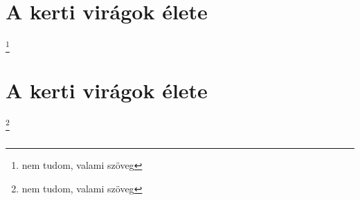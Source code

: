 \documentclass[twoside]{article}
\begin{document}
\section[Virágok]{A kerti virágok élete}
\footnote{nem tudom, valami szöveg}
\subsection{}
\hulipsum
\subsection{}
\hulipsum\section[Virágok]{A kerti virágok élete}
\footnote{nem tudom, valami szöveg}
\subsection{}
\hulipsum
\subsection{}
\hulipsum
\end{document}
